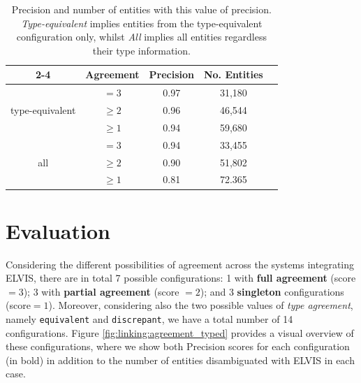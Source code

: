 \begin{table}[ht!]
\centering
\def\arraystretch{1.2}
	\begin{tabular}{| c | c | c | c | c |}
\cline{2-4}
\multicolumn{1}{ c |  }{} & \textbf{Agreement} & \textbf{Precision} & \textbf{No. Entities} \\
\hline
\multirow{3}{*}{type-equivalent} & $=3$ & 0.97 & 31,180\\
&$\geq2$ & 0.96 & 46,544 \\
&$\geq1$ & 0.94 & 59,680 \\
\hline
\multirow{3}{*}{all} & $=3$ & 0.94 & 33,455\\
&$\geq2$ & 0.90 & 51,802\\
&$\geq1$ & 0.81 & 72.365\\
\hline
	\end{tabular}
	\caption{Precision and number of entities with this value of precision. \textit{Type-equivalent} implies entities from the type-equivalent configuration only, whilst \textit{All} implies all entities regardless their type information.}
	\label{tbl:linking:results}
\end{table}

\section{Evaluation}
\label{sec:linking:eval}

Considering the different possibilities of agreement across the systems integrating \textsc{ELVIS}, there are in total 7 possible configurations: 1 with \textbf{full agreement} (score$=3$); 3 with \textbf{partial agreement} (score $=2$); and 3 \textbf{singleton} configurations (score$=1$). Moreover, considering also the two possible values of \textit{type agreement}, namely \texttt{equivalent} and \texttt{discrepant}, we have a total number of 14 configurations. Figure \ref{fig:linking:agreement_typed} provides a visual overview of these configurations, where we show both Precision scores for each configuration (in bold) in addition to the number of entities disambiguated with \textsc{ELVIS} in each case.

